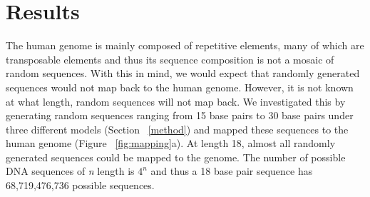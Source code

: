 \documentclass{article}
\begin{document}
\section{Results}\label{result}

The human genome is mainly composed of repetitive elements, many of which are transposable elements and thus its sequence composition is not a mosaic of random sequences. With this in mind, we would expect that randomly generated sequences would not map back to the human genome. However, it is not known at what length, random sequences will not map back. We investigated this by generating random sequences ranging from 15 base pairs to 30 base pairs under three different models (Section ~\ref{method}) and mapped these sequences to the human genome (Figure ~\ref{fig:mapping}a). At length 18, almost all randomly generated sequences could be mapped to the genome. The number of possible DNA sequences of \textit{n} length is $4^{n}$ and thus a 18 base pair sequence has 68,719,476,736 possible sequences.
\end{document}
